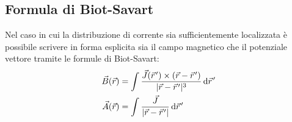 \documentclass[../main.tex]{subfiles}
\begin{document}
\subsection{Formula di Biot-Savart}
Nel caso in cui la distribuzione di corrente sia sufficientemente localizzata è possibile scrivere in forma esplicita sia il campo magnetico che il potenziale vettore tramite le formule di Biot-Savart:
\begin{align*}
	\vec B(\vec r)&=\int \frac{\vec J(\pvec r')\times(\vec r-\pvec r')}{\abs{\vec r-\pvec r'}^3}\de \pvec r' \label{BiotSavartB} \\
	\vec A(\vec r)&=\int \frac{\vec J}{\abs{\vec r-\pvec r'}}\de \pvec r'
\end{align*}
\end{document}
